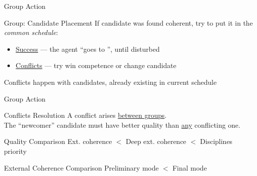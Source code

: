 
\begin{frame}{Group Action}
\end{frame}


\begin{frame}{Group: Candidate Placement}
  If candidate was found coherent, try to put it in the \emph{common schedule}:
  \begin{itemize}
    \item \underline{Success} --- the agent ``goes to '', until disturbed
    \item \underline{Conflicts} --- try \alert{win competence} or change candidate
  \end{itemize}
  \begin{block}{Conflicts}
    happen with candidates, already existing in current schedule
  \end{block}
  \centering
\end{frame}


\begin{frame}{Group Action}
\end{frame}


\begin{frame}{Conflicts Resolution}
  A conflict arises \underline{between groups}.
  \\\medskip
  The ``newcomer'' candidate must have better quality than \underline{any}
  conflicting one.
  \\\bigskip
  \begin{block}{Quality Comparison}
    \centering \bigskip
    Ext. coherence $<$ Deep ext. coherence $<$ Disciplines priority
  \end{block}
  \medskip
  \begin{block}{External Coherence Comparison}
    \centering \bigskip
    Preliminary mode $<$ Final mode
  \end{block}
\end{frame}

